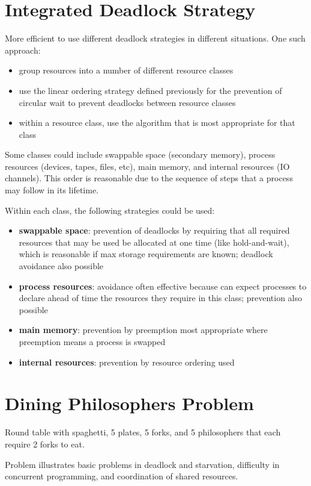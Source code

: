 \documentclass[11pt]{article}
\begin{document}
\section{Integrated Deadlock Strategy}
\label{sec:org52606c9}
More efficient to use different deadlock strategies in different situations.
One such approach:
\begin{itemize}
\item group resources into a number of different resource classes
\item use the linear ordering strategy defined previously for the prevention of
circular wait to prevent deadlocks between resource classes
\item within a resource class, use the algorithm that is most appropriate for
that class
\end{itemize}

Some classes could include swappable space (secondary memory), process
resources (devices, tapes, files, etc), main memory, and internal
resources (IO channels).
This order is reasonable due to the sequence of steps that a process may
follow in its lifetime.

Within each class, the following strategies could be used:
\begin{itemize}
\item \textbf{swappable space}: prevention of deadlocks by requiring that all required
resources that may be used be allocated at one time (like hold-and-wait),
which is reasonable if max storage requirements are known; deadlock
avoidance also possible
\item \textbf{process resources}: avoidance often effective because can expect processes
to declare ahead of time the resources they require in this class; prevention
also possible
\item \textbf{main memory}: prevention by preemption most appropriate where preemption
means a process is swapped
\item \textbf{internal resources}: prevention by resource ordering used
\end{itemize}
\section{Dining Philosophers Problem}
\label{sec:orgb84df01}
Round table with spaghetti, 5 plates, 5 forks, and 5 philosophers that each
require 2 forks to eat.

Problem illustrates basic problems in deadlock and starvation, difficulty in
concurrent programming, and coordination of shared resources.
\end{document}

